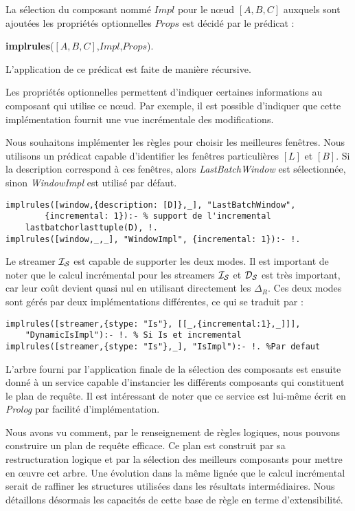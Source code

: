 \begin{regle}
La sélection du composant nommé $Impl$ pour le nœud $[A,B,C]$ auxquels sont ajoutées les propriétés optionnelles $Props$ est décidé par le prédicat :
\begin{center} \textbf{implrules}($[A,B,C]$,$Impl$,$Props$).\end{center}
L'application de ce prédicat est faite de manière récursive.
\end{regle}

Les propriétés optionnelles permettent d'indiquer certaines informations au composant qui utilise ce nœud. Par exemple, il est possible d'indiquer que cette implémentation fournit une vue incrémentale des modifications.
\begin{example}
	Nous souhaitons implémenter les règles pour choisir les meilleures fenêtres. Nous utilisons un prédicat capable d'identifier les fenêtres particulières $[L]$ et $[B]$. Si la description correspond à ces fenêtres, alors \textit{LastBatchWindow} est sélectionnée, sinon \textit{WindowImpl} est utilisé par défaut.
\begin{lstlisting}
implrules([window,{description: [D]},_], "LastBatchWindow", 
        {incremental: 1}):- % support de l'incremental
    lastbatchorlasttuple(D), !.
implrules([window,_,_], "WindowImpl", {incremental: 1}):- !.
\end{lstlisting}
\end{example}

\begin{example}
Le streamer $\mathcal{I_S}$ est capable de supporter les deux modes. Il est important de noter que le calcul incrémental pour les streamers $\mathcal{I_S}$ et $\mathcal{D_S}$ est très important, car leur coût devient quasi nul en utilisant directement les $\Delta_R$. Ces deux modes sont gérés par deux implémentations différentes, ce qui se traduit par :
\begin{lstlisting}
implrules([streamer,{stype: "Is"}, [[_,{incremental:1},_]]], 
    "DynamicIsImpl"):- !. % Si Is et incremental
implrules([streamer,{stype: "Is"},_], "IsImpl"):- !. %Par defaut
\end{lstlisting}
\end{example}

L'arbre fourni par l'application finale de la sélection des composants est ensuite donné à un service capable d'instancier les différents composants qui constituent le plan de requête. Il est intéressant de noter que ce service est lui-même écrit en \textit{Prolog} par facilité d'implémentation.

Nous avons vu comment, par le renseignement de règles logiques, nous pouvons construire un plan de requête efficace. Ce plan est construit par sa restructuration logique et par la sélection des meilleurs composants pour mettre en œuvre cet arbre. Une évolution dans la même lignée que le calcul incrémental serait de raffiner les structures utilisées dans les résultats intermédiaires. Nous détaillons désormais les capacités de cette base de règle en terme d'extensibilité.

